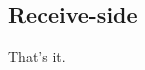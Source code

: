 \documentclass[11pt]{article}
\begin{document}
\subsection{Receive-side}

That's it.
\end{document}
